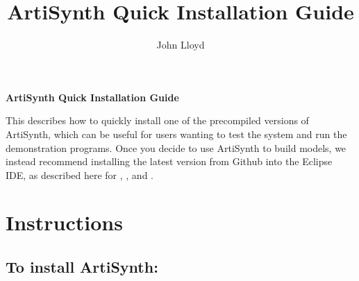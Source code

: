 \documentclass{article}
\title{ArtiSynth Quick Installation Guide}
\author{John Lloyd}
\date{}
\begin{document}

\iflatexml{\large\pubdate}\fi


\iflatexml\else
\begin{center}
{\sffamily\Large\bfseries ArtiSynth Quick Installation Guide}
\end{center}
\bigskip
\fi

This describes how to quickly install one of the precompiled versions of
ArtiSynth, which can be useful for users wanting to test the system and run the
demonstration programs. Once you decide to use ArtiSynth to build models, we
instead recommend installing the latest version from Github into the Eclipse
IDE, as described here for
,
,
and
.

\section{Instructions}

\subsection{To install ArtiSynth:}
\end{document}
